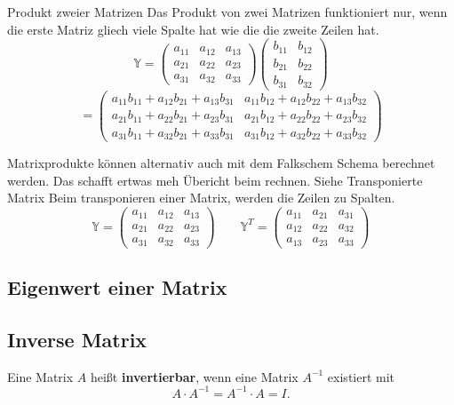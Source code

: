 \documentclass[10pt,a4paper,twocolumn]{article}
\begin{document}
	Produkt zweier Matrizen
	Das Produkt von zwei Matrizen funktioniert nur, wenn die erste Matriz gliech viele Spalte hat wie die die zweite Zeilen hat.
	$$
	\mathbb{Y} =
	\begin{pmatrix}
		a_{11} & a_{12} & a_{13} \\
		a_{21} & a_{22} & a_{23} \\
		a_{31} & a_{32} & a_{33}
	\end{pmatrix}
	\begin{pmatrix}
		b_{11} & b_{12} \\
		b_{21} & b_{22} \\
		b_{31} & b_{32}
	\end{pmatrix}
	$$
	$$=
	\begin{pmatrix}
		a_{11}b_{11} + a_{12}b_{21} + a_{13}b_{31} &
		a_{11}b_{12} + a_{12}b_{22} + a_{13}b_{32} \\
		a_{21}b_{11} + a_{22}b_{21} + a_{23}b_{31} &
		a_{21}b_{12} + a_{22}b_{22} + a_{23}b_{32} \\
		a_{31}b_{11} + a_{32}b_{21} + a_{33}b_{31} &
		a_{31}b_{12} + a_{32}b_{22} + a_{33}b_{32}
	\end{pmatrix}
	$$
	
	Matrixprodukte können alternativ auch mit dem Falkschem Schema berechnet werden. Das schafft ertwas meh Übericht beim rechnen. Siehe
	Transponierte Matrix
	Beim transponieren einer Matrix, werden die Zeilen zu Spalten.
	\[
	\mathbb{Y} =
	\begin{pmatrix}
		a_{11} & a_{12} & a_{13} \\
		a_{21} & a_{22} & a_{23} \\
		a_{31} & a_{32} & a_{33}
	\end{pmatrix}
	\qquad
	\mathbb{Y}^T =
	\begin{pmatrix}
		a_{11} & a_{21} & a_{31} \\
		a_{12} & a_{22} & a_{32} \\
		a_{13} & a_{23} & a_{33}
	\end{pmatrix}
	\]
	
	\subsection{Eigenwert einer Matrix}
	
	\subsection{Inverse Matrix}
	
	Eine Matrix $A$ heißt \textbf{invertierbar}, wenn eine Matrix $A^{-1}$ existiert mit
	\[
	A \cdot A^{-1} = A^{-1} \cdot A = I.
	\]
	
\end{document}
